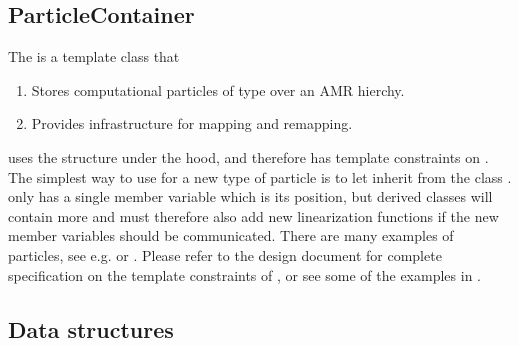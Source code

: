 \documentclass[letterpaper,10pt,english]{sphinxmanual}
\begin{document}
\subsection{ParticleContainer}
\label{\detokenize{Source/Particles:particlecontainer}}
\sphinxAtStartPar
The  is a template class that
\begin{enumerate}
%
\item {} 
\sphinxAtStartPar
Stores computational particles of type  over an AMR hierchy.

\item {} 
\sphinxAtStartPar
Provides infrastructure for mapping and remapping.

\end{enumerate}

\sphinxAtStartPar
{} uses the  structure  under the hood, and therefore has template constraints on .
The simplest way to use  for a new type of particle is to let  inherit from the  class .
 only has a single member variable which is its position, but derived classes will contain more and must therefore also add new linearization functions if the new member variables should be communicated.
There are many examples of  particles, see e.g.  or .
Please refer to the  design document for complete specification on the template constraints of , or see some of the examples in .


\subsection{Data structures}
\label{\detokenize{Source/Particles:data-structures}}
\end{document}
